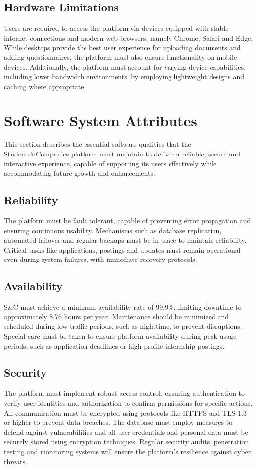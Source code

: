 \subsection{Hardware Limitations}
Users are required to access the platform via devices equipped with stable internet connections and modern web browsers, namely Chrome, Safari and Edge.
While desktops provide the best user experience for uploading documents and adding questionnaires, the platform must also ensure functionality on mobile devices.
Additionally, the platform must account for varying device capabilities, including lower bandwidth environments, by employing lightweight designs and caching where appropriate.

\section{Software System Attributes}
This section describes the essential software qualities that the Students\&Companies platform must maintain to deliver a reliable, secure and interactive experience, capable of supporting its users effectively while accommodating future growth and enhancements.

\subsection{Reliability}
The platform must be fault tolerant, capable of preventing error propagation and ensuring continuous usability.
Mechanisms such as database replication, automated failover and regular backups must be in place to maintain reliability.
Critical tasks like applications, postings and updates must remain operational even during system failures, with immediate recovery protocols.

\subsection{Availability}
S\&C must achieve a minimum availability rate of 99.9\%, limiting downtime to approximately 8.76 hours per year.
Maintenance should be minimized and scheduled during low-traffic periods, such as nighttime, to prevent disruptions.
Special care must be taken to ensure platform availability during peak usage periods, such as application deadlines or high-profile internship postings.

\subsection{Security}
The platform must implement robust access control, ensuring authentication to verify user identities and authorization to confirm permissions for specific actions.
All communication must be encrypted using protocols like HTTPS and TLS 1.3 or higher to prevent data breaches.
The database must employ measures to defend against vulnerabilities and all user credentials and personal data must be securely stored using encryption techniques.
Regular security audits, penetration testing and monitoring systems will ensure the platform's resilience against cyber threats.

